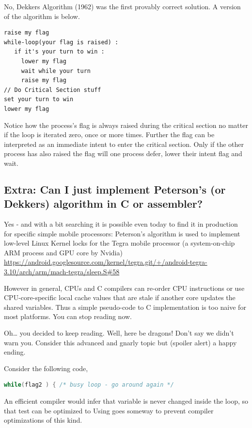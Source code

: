 No, Dekkers Algorithm (1962) was the first provably correct solution. A version of the algorithm is below.

\begin{lstlisting}
raise my flag
while-loop(your flag is raised) :
   if it's your turn to win :
     lower my flag
     wait while your turn
     raise my flag
// Do Critical Section stuff
set your turn to win
lower my flag
\end{lstlisting}

Notice how the process's flag is always raised during the critical section no matter if the loop is iterated zero, once or more times. Further the flag can be interpreted as an immediate intent to enter the critical section. Only if the other process has also raised the flag will one process defer, lower their intent flag and wait.

\subsection{Extra: Can I just implement Peterson's (or Dekkers) algorithm in C or assembler?}

Yes - and with a bit searching it is possible even today to find it in production for specific simple mobile processors: Peterson's algorithm is used to implement low-level Linux Kernel locks for the Tegra mobile processor (a system-on-chip ARM process and GPU core by Nvidia) \href{Link to Lock Source}{https://android.googlesource.com/kernel/tegra.git/+/android-tegra-3.10/arch/arm/mach-tegra/sleep.S\#58}

However in general, CPUs and C compilers can re-order CPU instructions or use CPU-core-specific local cache values that are stale if another core updates the shared variables. Thus a simple pseudo-code to C implementation is too naive for most platforms. You can stop reading now.

Oh\ldots{} you decided to keep reading. Well, here be dragons! Don't say we didn't warn you. Consider this advanced and gnarly topic but (spoiler alert) a happy ending.

Consider the following code,

\begin{lstlisting}[language=C]
while(flag2 ) { /* busy loop - go around again */
\end{lstlisting}

An efficient compiler would infer that  variable is never changed inside the loop, so that test can be optimized to  Using  goes someway to prevent compiler optimizations of this kind.

